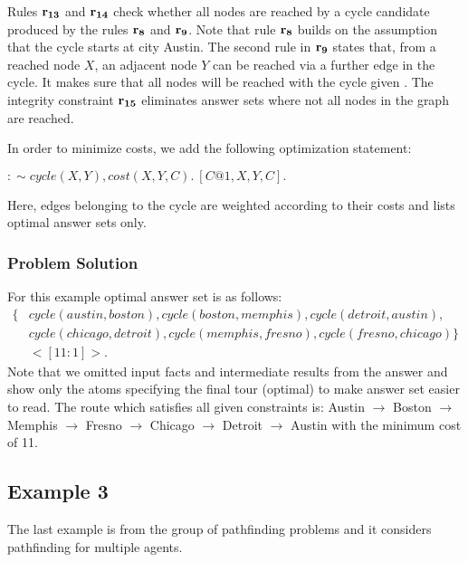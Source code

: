 \documentclass[a4paper, titlepage]{article}
\newcommand\mycenterline[1]{\par\smallskip\centerline{#1} \smallskip}
\newcommand{\row}[1]{%
  \ensuremath{\color{black}\ensuremath{\mathbf{#1}} \color{black}}%
}
\begin{document}
Rules $\row{r_{13}}$ and $\row{r_{14}}$ check whether all 
nodes 
are reached by a cycle candidate produced by the rules 
$\row{r_8}$ and $\row{r_9}$.  Note that rule $\row{r_8}$ builds on the
assumption that the cycle starts at city Austin. The second 
rule in $\row{r_9}$ states that, from a reached node $X$, an 
adjacent node $Y$ can be reached via a further edge in the 
cycle. It makes sure that all nodes will be reached with the 
cycle given \cite{gkklorst2015}. The integrity constraint $\row{r_{15}}$ 
eliminates answer sets where not all nodes in the graph are reached.

In order to minimize costs, we add the following 
optimization statement:
\mycenterline{$:\sim cycle(X,Y), cost(X,Y,C). \  [C@1,X,Y,C].$}
Here, edges belonging to the cycle are weighted according 
to their costs and \dlvhex{} lists optimal answer sets only.

\subsubsection{Problem Solution}
For this example optimal answer set 
is as follows:
\begin{align*}
\{&  cycle(austin,boston), 
cycle(boston,memphis),cycle(detroit,austin), \\
& cycle(chicago,detroit), 
cycle(memphis,fresno),cycle(fresno,chicago) \} \\
& <[11:1]>.
\end{align*}
Note that we omitted input facts and intermediate results from the answer and show only the atoms specifying the final tour (optimal) to make 
answer set easier to read. The route which satisfies all given constraints is: Austin $\rightarrow$ Boston $\rightarrow$ Memphis $\rightarrow$ Fresno $\rightarrow$ Chicago $\rightarrow$ Detroit $\rightarrow$ Austin with the minimum cost of 11. 




\subsection{Example 3}
\label{example3}
The last example is from the group of pathfinding problems and it considers pathfinding for multiple agents.
 
\end{document}
